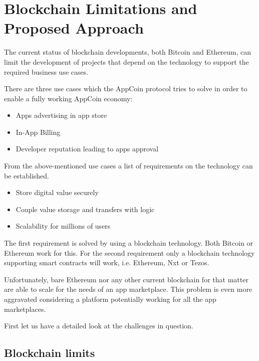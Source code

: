 \section{Blockchain Limitations and Proposed Approach}
\label{sec:limitations}


The current status of blockchain developments, both Bitcoin and Ethereum, can limit the development of projects that depend on the technology to support the required business use cases. %
 
There are three use cases which the AppCoin protocol tries to solve in order to enable a fully working AppCoin economy:


\begin{itemize}
    \item Apps advertising in app store
    \item In-App Billing 
    \item Developer reputation leading to apps approval
\end{itemize}

From the above-mentioned use cases a list of requirements on the technology can be established. 

\begin{itemize}
    \item Store digital value securely
    \item Couple value storage and transfers with logic
    \item Scalability for millions of users
\end{itemize}

The first requirement is solved by using a blockchain technology. Both Bitcoin or Ethereum work for this. For the second requirement only a blockchain technology supporting smart contracts will work, i.e. Ethereum, Nxt or Tezos.

Unfortunately, bare Ethereum nor any other current blockchain for that matter are able to scale for the needs of an app marketplace. This problem is even more aggravated considering a platform potentially working for all the app marketplaces.

First let us have a detailed look at the challenges in question.

\subsection{Blockchain limits}


